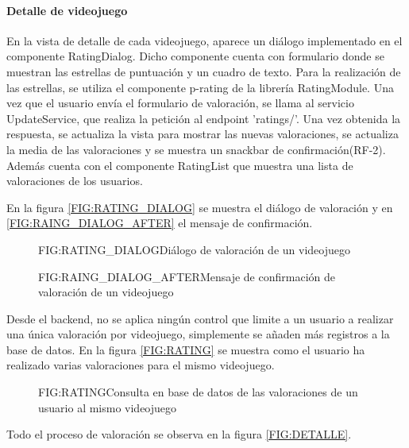 \paragraph{Detalle de videojuego}
En la vista de detalle de cada videojuego, aparece un diálogo implementado en el componente RatingDialog. Dicho componente cuenta con formulario 
donde se muestran las estrellas de puntuación y un cuadro de texto. Para la realización de las estrellas, se utiliza el 
componente p-rating de la librería RatingModule. Una vez que el usuario envía el formulario de valoración, se llama al servicio UpdateService, 
que realiza la petición al endpoint 'ratings/'. Una vez obtenida la respuesta, se actualiza la vista para mostrar las nuevas valoraciones, se actualiza 
la media de las valoraciones y se muestra un snackbar de confirmación(RF-2). Además cuenta con el componente RatingList que muestra una lista 
de valoraciones de los usuarios. 

En la figura \ref{FIG:RATING_DIALOG} se muestra el diálogo de valoración 
y en \ref{FIG:RAING_DIALOG_AFTER} el mensaje de confirmación.

\begin{figure}[Diálogo de valoración]{FIG:RATING_DIALOG}{Diálogo de valoración de un videojuego}
\end{figure}

\begin{figure}[Mensaje de confirmación de valoración]{FIG:RAING_DIALOG_AFTER}{Mensaje de confirmación de valoración de un videojuego}
\end{figure}

Desde el backend, no se aplica ningún control que limite a un usuario a realizar una única valoración por videojuego, simplemente 
se añaden más registros a la base de datos. En la figura \ref{FIG:RATING} se muestra como el usuario ha realizado varias valoraciones para 
el mismo videojuego. 

\begin{figure}[Valoraciones de un usuario]{FIG:RATING}{Consulta en base de datos de las valoraciones de un usuario al mismo videojuego}
\end{figure}

Todo el proceso de valoración se observa en la figura \ref{FIG:DETALLE}.
